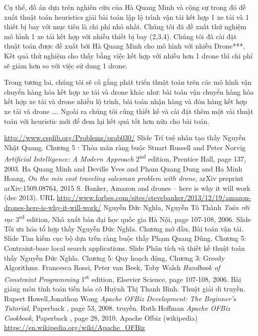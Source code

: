\documentclass[a4paper,12pt]{report}
\begin{document}
Cụ thể, đồ án dựa trên nghiên cứu của Hà Quang Minh và cộng sự trong đó đề xuất thuật toán heuristics giải bài toán lập lộ trình vận tải kết hợp 1 xe tải và 1 thiết bị bay với mục tiêu là chi phí nhỏ nhất. Chúng tôi đã đề xuất thử nghiệm mô hình 1 xe tải kết hợp với nhiều thiết bị bay (2,3,4). Chúng tôi đã cài đặt thuật toán được đề xuất bởi Hà Quang Minh cho mô hình với nhiều Drone***. Kết quả thử nghiệm cho thấy bằng việc kết hợp với nhiều hơn 1 drone thì chi phí sẽ giảm hơn so với việc sử dung 1 drone.

Trong tương lai, chúng tôi sẽ cố gắng phát triển thuật toán trên các mô hình vận chuyển hàng hóa kết hợp xe tải và drone khác như: bài toán vận chuyển hàng hóa kết hợp xe tải và drone nhiều lộ trình, bài toán nhận hàng và đón hàng kết hợp xe tải và drone \ldots. Ngoài ra chúng tôi cũng thiết kế và cài đặt thêm một vài thuật toán với heuristic mới để đem lại kết quả tốt hơn nữa cho bài toán.

\begin{thebibliography}{9}
 \url{http://www.csplib.org/Problems/prob030/}
 Slide Trí tuệ nhân tạo thầy Nguyễn Nhật Quang. Chương 5 : Thỏa mãn ràng buộc
 Stuart Russell and Peter Norvig 
\textit{Artificial Intelligence: A Modern Approach} 2\textsuperscript{nd } edition, Prentice Hall, page 137,  2003.
 Ha Quang Minh and Deville Yves and Pham Quang Dung and Ha Minh Hoang, \textit{On the min cost traveling salesman problem with drone}, arXiv preprint arXiv:1509.08764, 2015
 S. Banker, Amazon and drones – here is why it will work (dec 2013).
URL \url{http://www.forbes.com/sites/stevebanker/2013/12/19/amazon-drones-here-is-why-it-will-work/}
 Nguyễn Đức Nghĩa, Nguyễn Tô Thành 
\textit{Toán rời rạc} 3\textsuperscript{rd} edition, Nhà xuất bản đại học quốc gia Hà Nội, page 107-108,  2006.
 Slide Tối ưu hóa tổ hợp thầy Nguyễn Đức Nghĩa. Chương mở đầu, Bài toán vận tải.
 Slide Tìm kiếm cục bộ dựa trên ràng buộc thầy Phạm Quang Dũng. Chương 5: Contraint-base local search applications.
 Slide Phân tích và thiết kế thuật toán thầy Nguyễn Đức Nghĩa. Chương 5: Quy hoạch động, Chương 3: Greedy Algorithms.
 Francesca Rossi, Peter van Beek, Toby Walsh 
\textit{Handbook of Constraint Programming} 1\textsuperscript{st} edition, Elsevier Science, page 107-108,  2006.
 Bài giảng môn tính toán tiến hóa cô Huỳnh Thị Thanh Bình. Thuật giải di truyền.
Rupert Howell,Jonathon Wong
\textit{Apache OFBiz Development: The Beginner's Tutorial}, Paperback , page 53,  2008.
truyền.
 Ruth Hoffman
\textit{Apache OFBiz Cookbook}, Paperback , page 28, 2010.
 Apache Ofbiz (wikipedia)
\url{https://en.wikipedia.org/wiki/Apache_OFBiz}
\end{thebibliography}
\end{document}
